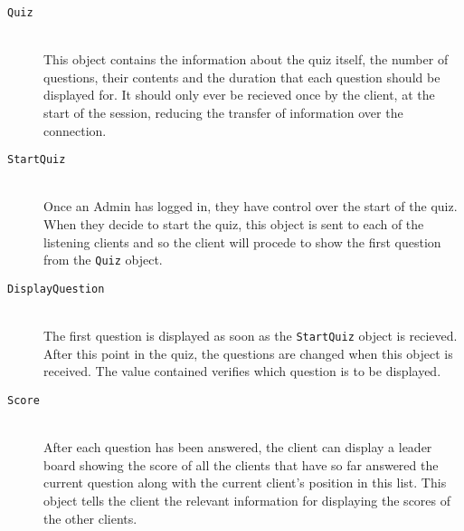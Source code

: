 \begin{enumerate}
	\begin{description}
		\item[\texttt{Quiz}]\hfill \\ This object contains the information
		about the quiz itself, the number of questions, their contents and the
		duration that each question should be displayed for. It should only
		ever be recieved once by the client, at the start of the session,
		reducing the transfer of information over the connection.

		\item[\texttt{StartQuiz}]\hfill \\ Once an Admin has logged in, they
		have control over the start of the quiz. When they decide to start the
		quiz, this object is sent to each of the listening clients and so the
		client will procede to show the first question from the \texttt{Quiz}
		object.

		\item[\texttt{DisplayQuestion}]\hfill \\ The first question is
		displayed as soon as the \texttt{StartQuiz} object is recieved. After
		this point in the quiz, the questions are changed when this object is
		received. The value contained verifies which question is to be
		displayed.

		\item[\texttt{Score}]\hfill \\ After each question has been answered,
		the client can display a leader board showing the score of all the
		clients that have so far answered the current question along with the
		current client's position in this list. This object tells the client
		the relevant information for displaying the scores of the other
		clients.
	\end{description}

\end{enumerate}
